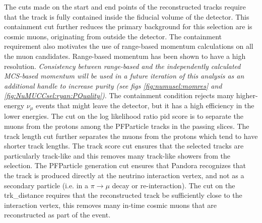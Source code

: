\par \noindent The cuts made on the start and end points of the reconstructed tracks require that the track is fully contained inside the fiducial volume of the detector. This containment cut further reduces the primary background for this selection are is cosmic muons, originating from outside the detector. The containment requirement also motivates the use of range-based momentum calculations on all the muon candidates. Range-based momentum has been shown to have a high resolution. \emph{Consistency between range-based and the independently calculated MCS-based momentum will be used in a future iteration of this analysis as an additional handle to increase purity (see figs \ref{fig:numusel:momres} and \ref{fig:NuMUCCsel:ryan:PQuality})}. The containment condition rejects many higher-energy $\nu_{\mu}$ events that might leave the detector, but it has a high efficiency in the lower energies.
The cut on the log likelihood ratio pid score is to separate the muons from the protons among the PFParticle tracks in the passing slices. The track length cut further separates the muons from the protons which tend to have shorter track lengths. 
The track score cut ensures that the selected tracks are particularly track-like and this removes many track-like showers from the selection.  The PFParticle generation cut ensures that Pandora recognizes that the track is produced directly at the neutrino interaction vertex, and not as a secondary particle (i.e. in a $\pi \rightarrow \mu$ decay or re-interaction). 
The cut on the trk\_distance requires that the reconstructed track be sufficiently close to the interaction vertex, this removes many in-time cosmic muons that are reconstructed as part of the event.

